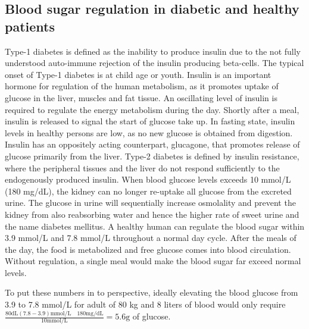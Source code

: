 \subsection{Blood sugar regulation in diabetic and healthy patients}
Type-1 diabetes  is defined as the inability to produce insulin due to the not fully understood auto-immune rejection of the insulin producing beta-cells. The typical onset of Type-1 diabetes is at child age or youth. Insulin is an important hormone for regulation of the human metabolism, as it promotes uptake of glucose in the liver, muscles and fat tissue. An oscillating level of insulin is required to regulate the energy metabolism during the day. Shortly after a meal, insulin is released to signal the start of glucose take up. In fasting state, insulin levels in healthy persons are low, as no new glucose is obtained from digestion. Insulin has an oppositely acting counterpart, glucagone, that promotes release of glucose primarily from the liver. Type-2 diabetes is defined by insulin resistance, where the peripheral tissues and the liver do not respond sufficiently to the endogenously produced insulin. When blood glucose levels exceeds 10 mmol/L (180 mg/dL), the kidney can no longer re-uptake all glucose from the excreted urine. The glucose in urine will sequentially increase osmolality and prevent the kidney from also reabsorbing water and hence the higher rate of sweet urine and the name diabetes mellitus. A healthy human can regulate the blood sugar within 3.9 mmol/L and 7.8 mmol/L throughout a normal day cycle. After the meals of the day, the food is metabolized and free glucose comes into blood circulation. Without regulation, a single meal would make the blood sugar far exceed normal levels\cite{silverthorn2010human,Cowart1990}.

To put these numbers in to perspective, ideally elevating the blood glucose from 3.9 to 7.8 mmol/L for adult of 80 kg and 8 liters of blood would only require
$\frac { 80 \textrm{dL} (7.8-3.9) \textrm{mmol/L} \quad 180\textrm{mg/dL} }
		{ 10 \textrm{mmol/L} } = 5.6 \textrm{g}$ of glucose.

